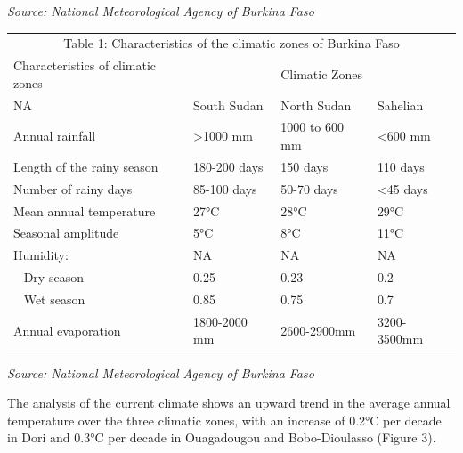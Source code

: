 \documentclass[
]{book}
\begin{document}
\emph{Source: National Meteorological Agency of Burkina Faso}

\begin{tabular}{>{}l|>{}l|>{}l|>{}l}
\hline
\multicolumn{4}{c}{Table 1: Characteristics of the climatic zones of Burkina Faso} \\
\cline{1-4}
Characteristics of climatic zones &   & Climatic Zones &  \\
\hline
NA & South Sudan & North Sudan & Sahelian\\
\hline
Annual rainfall & >1000 mm & 1000 to 600 mm & <600 mm\\
\hline
Length of the rainy season & 180-200 days & 150 days & 110 days\\
\hline
Number of rainy days & 85-100 days & 50-70 days & <45 days\\
\hline
Mean annual temperature & 27°C & 28°C & 29°C\\
\hline
Seasonal amplitude & 5°C & 8°C & 11°C\\
\hline
Humidity: & NA & NA & NA\\
\hline
  Dry season & 0.25 & 0.23 & 0.2\\
\hline
  Wet season & 0.85 & 0.75 & 0.7\\
\hline
Annual evaporation & 1800-2000 mm & 2600-2900mm & 3200-3500mm\\
\hline
\end{tabular}

\emph{Source: National Meteorological Agency of Burkina Faso}

The analysis of the current climate shows an upward trend in the average annual temperature over the three climatic zones, with an increase of 0.2°C per decade in Dori and 0.3°C per decade in Ouagadougou and Bobo-Dioulasso (Figure 3).
\end{document}
